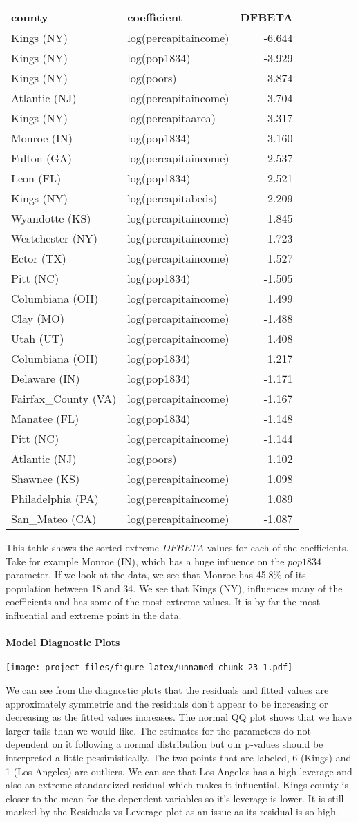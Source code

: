 \documentclass[]{article}
\let\oldparagraph\paragraph
\renewcommand{\paragraph}[1]{\oldparagraph{#1}\mbox{}}
\begin{document}
\begin{longtable}[]{@{}llr@{}}
\toprule
county & coefficient & DFBETA\tabularnewline
\midrule
\endhead
Kings (NY) & log(percapitaincome) & -6.644\tabularnewline
Kings (NY) & log(pop1834) & -3.929\tabularnewline
Kings (NY) & log(poors) & 3.874\tabularnewline
Atlantic (NJ) & log(percapitaincome) & 3.704\tabularnewline
Kings (NY) & log(percapitaarea) & -3.317\tabularnewline
Monroe (IN) & log(pop1834) & -3.160\tabularnewline
Fulton (GA) & log(percapitaincome) & 2.537\tabularnewline
Leon (FL) & log(pop1834) & 2.521\tabularnewline
Kings (NY) & log(percapitabeds) & -2.209\tabularnewline
Wyandotte (KS) & log(percapitaincome) & -1.845\tabularnewline
Westchester (NY) & log(percapitaincome) & -1.723\tabularnewline
Ector (TX) & log(percapitaincome) & 1.527\tabularnewline
Pitt (NC) & log(pop1834) & -1.505\tabularnewline
Columbiana (OH) & log(percapitaincome) & 1.499\tabularnewline
Clay (MO) & log(percapitaincome) & -1.488\tabularnewline
Utah (UT) & log(percapitaincome) & 1.408\tabularnewline
Columbiana (OH) & log(pop1834) & 1.217\tabularnewline
Delaware (IN) & log(pop1834) & -1.171\tabularnewline
Fairfax\_County (VA) & log(percapitaincome) & -1.167\tabularnewline
Manatee (FL) & log(pop1834) & -1.148\tabularnewline
Pitt (NC) & log(percapitaincome) & -1.144\tabularnewline
Atlantic (NJ) & log(poors) & 1.102\tabularnewline
Shawnee (KS) & log(percapitaincome) & 1.098\tabularnewline
Philadelphia (PA) & log(percapitaincome) & 1.089\tabularnewline
San\_Mateo (CA) & log(percapitaincome) & -1.087\tabularnewline
\bottomrule
\end{longtable}

This table shows the sorted extreme \(DFBETA\) values for each of the
coefficients. Take for example Monroe (IN), which has a huge influence
on the \(pop1834\) parameter. If we look at the data, we see that Monroe
has 45.8\% of its population between 18 and 34. We see that Kings (NY),
influences many of the coefficients and has some of the most extreme
values. It is by far the most influential and extreme point in the data.

\paragraph{Model Diagnostic Plots}\label{model-diagnostic-plots}

\texttt{[image: project\_files/figure-latex/unnamed-chunk-23-1.pdf]}

We can see from the diagnostic plots that the residuals and fitted
values are approximately symmetric and the residuals don't appear to be
increasing or decreasing as the fitted values increases. The normal QQ
plot shows that we have larger tails than we would like. The estimates
for the parameters do not dependent on it following a normal
distribution but our p-values should be interpreted a little
pessimistically. The two points that are labeled, 6 (Kings) and 1 (Los
Angeles) are outliers. We can see that Los Angeles has a high leverage
and also an extreme standardized residual which makes it influential.
Kings county is closer to the mean for the dependent variables so it's
leverage is lower. It is still marked by the Residuals vs Leverage plot
as an issue as its residual is so high.
\end{document}
